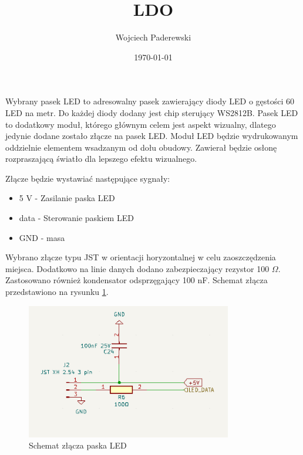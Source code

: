 \documentclass[../../main.tex]{subfiles}
\author{Wojciech Paderewski}
\date{\today}
\title{LDO}
\begin{document}
Wybrany pasek LED to adresowalny pasek zawierający diody LED o gęstości 60 LED na metr. Do każdej diody dodany jest chip sterujący WS2812B.
Pasek LED to dodatkowy moduł, którego głównym celem jest aspekt wizualny, dlatego jedynie dodane zostało złącze na pasek LED.
Moduł LED będzie wydrukowanym oddzielnie elementem wsadzanym od dołu obudowy. Zawierał będzie osłonę rozpraszającą światło dla lepszego
efektu wizualnego.

Złącze będzie wystawiać następujące sygnały:
\begin{itemize}
    \item 5 V - Zasilanie paska LED
    \item data - Sterowanie paskiem LED
    \item GND - masa
\end{itemize}

Wybrano złącze typu JST w orientacji horyzontalnej w celu zaoszczędzenia miejsca. Dodatkowo na linie danych dodano zabezpieczający rezystor 100 $\Omega$.
Zastosowano również kondensator odsprzęgający 100 nF. Schemat złącza przedstawiono na rysunku \ref{fig:LED}.

\begin{figure}[H]
    \centering
    \includegraphics[width=0.8\textwidth]{LED.png}
    \caption{Schemat złącza paska LED}
    \label{fig:LED}
\end{figure}
\end{document}

